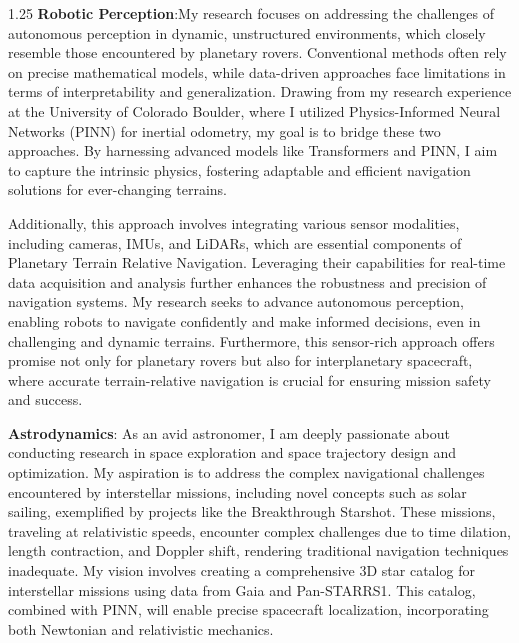 \documentclass[a4paper,12pt]{article}
\begin{document}
\begin{spacing}{1.25}
\textbf{Robotic Perception}:My research focuses on addressing the challenges of autonomous perception in dynamic, unstructured environments, which closely resemble those encountered by planetary rovers. Conventional methods often rely on precise mathematical models, while data-driven approaches face limitations in terms of interpretability and generalization. Drawing from my research experience at the University of Colorado Boulder, where I utilized Physics-Informed Neural Networks (PINN) for inertial odometry, my goal is to bridge these two approaches. By harnessing advanced models like Transformers and PINN, I aim to capture the intrinsic physics, fostering adaptable and efficient navigation solutions for ever-changing terrains.

Additionally, this approach involves integrating various sensor modalities, including cameras, IMUs, and LiDARs, which are essential components of Planetary Terrain Relative Navigation. Leveraging their capabilities for real-time data acquisition and analysis further enhances the robustness and precision of navigation systems. My research seeks to advance autonomous perception, enabling robots to navigate confidently and make informed decisions, even in challenging and dynamic terrains. Furthermore, this sensor-rich approach offers promise not only for planetary rovers but also for interplanetary spacecraft, where accurate terrain-relative navigation is crucial for ensuring mission safety and success.


\textbf{Astrodynamics}: As an avid astronomer, I am deeply passionate about conducting research in space exploration and space trajectory design and optimization. My aspiration is to address the complex navigational challenges encountered by interstellar missions, including novel concepts such as solar sailing, exemplified by projects like the Breakthrough Starshot. These missions, traveling at relativistic speeds, encounter complex challenges due to time dilation, length contraction, and Doppler shift, rendering traditional navigation techniques inadequate. My vision involves creating a comprehensive 3D star catalog for interstellar missions using data from Gaia and Pan-STARRS1. This catalog, combined with PINN, will enable precise spacecraft localization, incorporating both Newtonian and relativistic mechanics.


\end{spacing}
\end{document}
